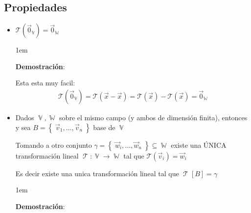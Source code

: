 \documentclass[12pt, fleqn]{report}                             %
\newenvironment{SmallIndentation}[1][0.75em]                    %
        {\begin{adjustwidth}{#1}{}\begin{footnotesize}}             %
        {\end{footnotesize}\end{adjustwidth}}                       %
\theoremstyle{break}                                            %
\DeclareMathOperator \VectorSet    {\mathbb{V}}                 %
\DeclareMathOperator \SubVectorSet {\mathbb{W}}                 %
\DeclareMathOperator \LinTrans      {\mathcal{T}}               %
\newcommand{\Set}[1]            {\left\{ \; #1 \; \right\}}     %
\newcommand{\Wrap}[1]           {\left( #1 \right)}             %
\newcommand{\FnLinTrans}[1]{\mathcal{T}\Wrap{#1}}               %
\begin{document}
            \clearpage
            \subsection{Propiedades}

                \begin{itemize}
                    \item 
                        $\FnLinTrans{\vec 0_{\VectorSet}} = \vec 0_{\SubVectorSet}$

                        \begin{SmallIndentation}[1em]
                            \textbf{Demostración}:
                            
                            Esta esta muy facil:
                            \begin{align*}
                                \FnLinTrans{\vec 0_{\VectorSet}}
                                    = \FnLinTrans{\vec x - \vec x}                     
                                    = \FnLinTrans{\vec x} - \FnLinTrans{\vec x}        
                                    = \vec 0_{\SubVectorSet}
                            \end{align*}
                        
                        \end{SmallIndentation}

                    \item
                        Dados $\VectorSet, \SubVectorSet$ sobre el mismo campo (y ambos de dimensión finita), entonces y
                        sea $B = \Set{\vec v_1, \dots, \vec v_n}$ base de $\VectorSet$

                        Tomando a otro conjunto $\gamma = \Set{\vec w_i, \dots, \vec w_n} \subseteq \SubVectorSet$
                        existe una ÚNICA transformación lineal $\LinTrans: \VectorSet \to \SubVectorSet$
                        tal que $\FnLinTrans{\vec v_i} = \vec w_i$

                        Es decir existe una unica transformación lineal tal que $\LinTrans[B] = \gamma$

                        \begin{SmallIndentation}[1em]
                            \textbf{Demostración}:
                            

\end{SmallIndentation}
\end{itemize}
\end{document}
